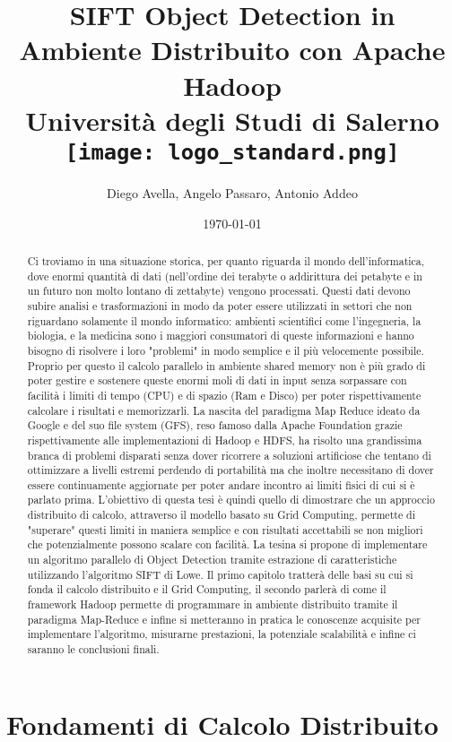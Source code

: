 \documentclass[12pt,a4paper,oneside]{report}
\title{
  {SIFT Object Detection in Ambiente Distribuito con Apache Hadoop}\\
  {\large Università degli Studi di Salerno}\\
  {\texttt{[image: logo\_standard.png]}}
}
\author{Diego Avella, Angelo Passaro, Antonio Addeo}
\date{\today}
\begin{document}
  \maketitle
  \begin{abstract}
    Ci troviamo in una situazione storica, per quanto riguarda il mondo dell'informatica, dove enormi quantità di dati (nell'ordine dei terabyte o addirittura dei petabyte e in un  futuro non molto lontano di zettabyte) vengono processati. Questi dati devono subire analisi e trasformazioni in modo da poter essere utilizzati in settori che non riguardano solamente il mondo informatico: ambienti scientifici come l'ingegneria, la biologia, e la medicina sono i maggiori consumatori di queste informazioni e hanno bisogno di risolvere i loro "problemi" in modo semplice e il più velocemente possibile. Proprio per questo il calcolo parallelo in ambiente shared memory non è più grado di poter gestire e sostenere queste enormi moli di dati in input senza sorpassare con facilità i limiti di tempo (CPU) e di spazio (Ram e Disco) per poter rispettivamente calcolare i risultati e memorizzarli. La nascita del paradigma Map Reduce ideato da Google e del suo file system (GFS), reso famoso dalla Apache Foundation grazie rispettivamente alle implementazioni di Hadoop e HDFS, ha risolto una grandissima branca di problemi disparati senza dover ricorrere a soluzioni artificiose che tentano di ottimizzare a livelli estremi perdendo di portabilità ma che inoltre necessitano di dover essere continuamente aggiornate per poter andare incontro ai limiti fisici di cui si è parlato prima. L'obiettivo di questa tesi è quindi quello di dimostrare che un approccio distribuito di calcolo, attraverso il modello basato su Grid Computing, permette di "superare" questi limiti in maniera semplice e con risultati accettabili se non migliori che potenzialmente possono scalare con facilità. La tesina si propone di implementare un algoritmo parallelo di Object Detection tramite estrazione di caratteristiche utilizzando l'algoritmo SIFT di Lowe. Il primo capitolo tratterà delle basi su cui si fonda il calcolo distribuito e il Grid Computing, il secondo parlerà di come il framework Hadoop permette di programmare in ambiente distribuito tramite il paradigma Map-Reduce e infine si metteranno in pratica le conoscenze acquisite per implementare l'algoritmo, misurarne prestazioni, la potenziale scalabilità e infine ci saranno le conclusioni finali.
  \end{abstract}
  \tableofcontents
  \listoffigures
  \chapter{Fondamenti di Calcolo Distribuito}
  
\end{document}
